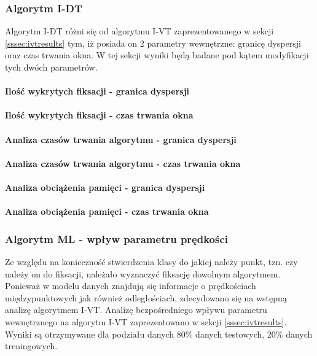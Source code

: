 \subsubsection{Algorytm I-DT}
\label{sssec:idtresults}
Algorytm I-DT różni się od algorytmu I-VT zaprezentowanego w sekcji \ref{sssec:ivtresults} tym, iż posiada on 2 parametry wewnętrzne: granicę dyspersji oraz czas trwania okna. W tej sekcji wyniki będą badane pod kątem modyfikacji tych dwóch parametrów.
\paragraph{Ilość wykrytych fiksacji - granica dyspersji\\}
\paragraph{Ilość wykrytych fiksacji - czas trwania okna\\}
\paragraph{Analiza czasów trwania algorytmu - granica dyspersji\\}
\paragraph{Analiza czasów trwania algorytmu - czas trwania okna\\}
\paragraph{Analiza obciążenia pamięci - granica dyspersji\\}
\paragraph{Analiza obciążenia pamięci - czas trwania okna\\}
\subsubsection{Algorytm ML - wpływ parametru prędkości}
\label{sssec:mlivt}
Ze względu na konieczność stwierdzenia klasy do jakiej należy punkt, tzn. czy należy on do fiksacji, należało wyznaczyć fiksację dowolnym algorytmem. Ponieważ w modelu danych znajdują się informacje o prędkościach międzypunktowych jak również odległościach, zdecydowano się na wstępną analizę algorytmem I-VT. Analizę bezpośredniego wpływu parametru wewnętrznego na algorytm I-VT zaprezentowano w sekcji \ref{sssec:ivtresults}. Wyniki są otrzymywane dla podziału danych 80\% danych testowych, 20\% danych treningowych.
